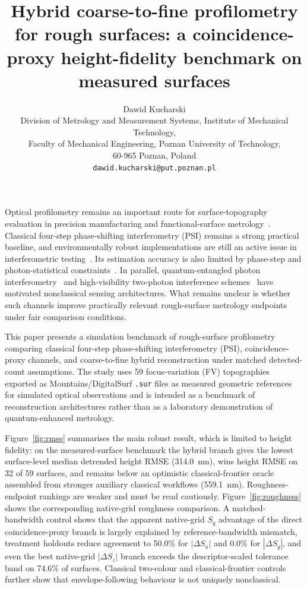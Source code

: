 \documentclass[11pt,a4paper]{article}
\title{Hybrid coarse-to-fine profilometry for rough surfaces: a coincidence-proxy height-fidelity benchmark on measured surfaces}
\author{Dawid Kucharski\\
Division of Metrology and Measurement Systems, Institute of Mechanical Technology,\\
Faculty of Mechanical Engineering, Poznan University of Technology,\\
60-965 Poznan, Poland\\
\texttt{dawid.kucharski@put.poznan.pl}}
\date{}
\begin{document}
\maketitle

Optical profilometry remains an important route for surface-topography evaluation in precision manufacturing and functional-surface metrology~\cite{vorburger1981}. Classical four-step phase-shifting interferometry (PSI) remains a strong practical baseline, and environmentally robust implementations are still an active issue in interferometric testing~\cite{mcdonnell2020}. Its estimation accuracy is also limited by phase-step and photon-statistical constraints~\cite{okamoto2021}. In parallel, quantum-entangled photon interferometry~\cite{richards2004} and high-visibility two-photon interference schemes~\cite{rarity1993} have motivated nonclassical sensing architectures. What remains unclear is whether such channels improve practically relevant rough-surface metrology endpoints under fair comparison conditions.

This paper presents a simulation benchmark of rough-surface profilometry comparing classical four-step phase-shifting interferometry (PSI), coincidence-proxy channels, and coarse-to-fine hybrid reconstruction under matched detected-count assumptions. The study uses 59 focus-variation (FV) topographies exported as Mountains/DigitalSurf \texttt{.sur} files as measured geometric references for simulated optical observations and is intended as a benchmark of reconstruction architectures rather than as a laboratory demonstration of quantum-enhanced metrology.

Figure~\ref{fig:rmse} summarises the main robust result, which is limited to height fidelity: on the measured-surface benchmark the hybrid branch gives the lowest surface-level median detrended height RMSE (314.0~nm), wins height RMSE on 32 of 59 surfaces, and remains below an optimistic classical-frontier oracle assembled from stronger auxiliary classical workflows (559.1~nm). Roughness-endpoint rankings are weaker and must be read cautiously. Figure~\ref{fig:roughness} shows the corresponding native-grid roughness comparison. A matched-bandwidth control shows that the apparent native-grid $S_q$ advantage of the direct coincidence-proxy branch is largely explained by reference-bandwidth mismatch, treatment holdouts reduce agreement to 50.0\% for $|\Delta S_a|$ and 0.0\% for $|\Delta S_q|$, and even the best native-grid $|\Delta S_z|$ branch exceeds the descriptor-scaled tolerance band on 74.6\% of surfaces. Classical two-colour and classical-frontier controls further show that envelope-following behaviour is not uniquely nonclassical.
\end{document}
